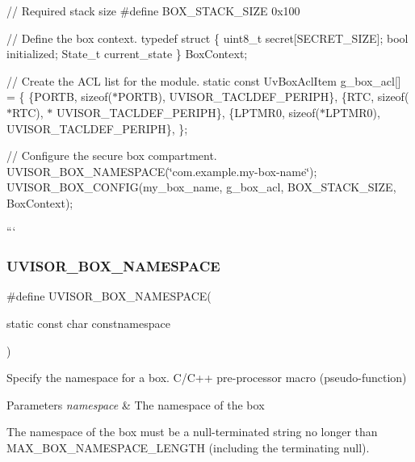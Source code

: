 // Required stack size \#define B\+O\+X\+\_\+\+S\+T\+A\+C\+K\+\_\+\+S\+I\+ZE 0x100

// Define the box context. typedef struct \{ uint8\+\_\+t secret\mbox{[}S\+E\+C\+R\+E\+T\+\_\+\+S\+I\+ZE\mbox{]}; bool initialized; State\+\_\+t current\+\_\+state \} Box\+Context;

// Create the A\+CL list for the module. static const Uv\+Box\+Acl\+Item g\+\_\+box\+\_\+acl\mbox{[}\mbox{]} = \{ \{P\+O\+R\+TB, sizeof($\ast$\+P\+O\+R\+T\+B), U\+V\+I\+S\+O\+R\+\_\+\+T\+A\+C\+L\+D\+E\+F\+\_\+\+P\+E\+R\+I\+PH\}, \{R\+TC, sizeof($\ast$\+R\+T\+C), $\ast$ U\+V\+I\+S\+O\+R\+\_\+\+T\+A\+C\+L\+D\+E\+F\+\_\+\+P\+E\+R\+I\+PH\}, \{L\+P\+T\+M\+R0, sizeof($\ast$\+L\+P\+T\+M\+R0), U\+V\+I\+S\+O\+R\+\_\+\+T\+A\+C\+L\+D\+E\+F\+\_\+\+P\+E\+R\+I\+PH\}, \};

// Configure the secure box compartment. U\+V\+I\+S\+O\+R\+\_\+\+B\+O\+X\+\_\+\+N\+A\+M\+E\+S\+P\+A\+CE(\char`\"{}com.\+example.\+my-\/box-\/name\char`\"{}); U\+V\+I\+S\+O\+R\+\_\+\+B\+O\+X\+\_\+\+C\+O\+N\+F\+IG(my\+\_\+box\+\_\+name, g\+\_\+box\+\_\+acl, B\+O\+X\+\_\+\+S\+T\+A\+C\+K\+\_\+\+S\+I\+ZE, Box\+Context);

``` \hypertarget{group__hypervisor_gafe52bfcc466d459d149c63966c2f4a58}{}\label{group__hypervisor_gafe52bfcc466d459d149c63966c2f4a58}
\subsubsection{\texorpdfstring{U\+V\+I\+S\+O\+R\+\_\+\+B\+O\+X\+\_\+\+N\+A\+M\+E\+S\+P\+A\+CE}{UVISOR\_BOX\_NAMESPACE}}
{\footnotesize\ttfamily \#define U\+V\+I\+S\+O\+R\+\_\+\+B\+O\+X\+\_\+\+N\+A\+M\+E\+S\+P\+A\+CE(\begin{DoxyParamCaption}\item[{}]{static const char constnamespace }\end{DoxyParamCaption})}



Specify the namespace for a box. C/\+C++ pre-\/processor macro (pseudo-\/function)


\begin{DoxyParams}{Parameters}
{\em namespace} & The namespace of the box\\
\hline
\end{DoxyParams}
The namespace of the box must be a null-\/terminated string no longer than M\+A\+X\+\_\+\+B\+O\+X\+\_\+\+N\+A\+M\+E\+S\+P\+A\+C\+E\+\_\+\+L\+E\+N\+G\+TH (including the terminating null).

